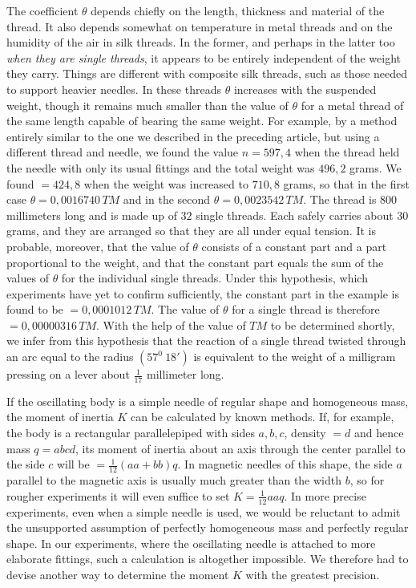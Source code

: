 The coefficient $\theta$ depends chiefly on the length, thickness and material of the thread. It also depends somewhat on temperature in metal threads and on the humidity of the air in silk threads. In the former, and perhaps in the latter too \textit{when they are single threads}, it appears to be entirely independent of the weight they carry. Things are different with composite silk threads, such as those needed to support heavier needles. In these threads $\theta$ increases with the suspended weight, though it remains much smaller than the value of $\theta$ for a metal thread of the same length capable of bearing the same weight. For example, by a method entirely similar to the one we described in the preceding article, but using a different thread and needle, we found the value $n=597{,}4$ when the thread held the needle with only its usual fittings and the total weight was $496{,}2$ grams. We found $=424{,}8$ when the weight was increased to $710{,}8$ grams, so that in the first case $\theta=0{,}0016740\,TM$ and in the second $\theta=0{,}0023542\,TM$. The thread is $800$ millimeters long and is made up of $32$ single threads. Each safely carries about $30$ grams, and they are arranged so that they are all under equal tension. It is probable, moreover, that the value of $\theta$ consists of a constant part and a part proportional to the weight, and that the constant part equals the sum of the values of $\theta$ for the individual single threads. Under this hypothesis, which experiments have yet to confirm sufficiently, the constant part in the example is found to be $=0{,}0001012\,TM$. The value of $\theta$ for a single thread is therefore $=0{,}00000316\,TM$. With the help of the value of $TM$ to be determined shortly, we infer from this hypothesis that the reaction of a single thread twisted through an arc equal to the radius $(57^0\ 18')$ is equivalent to the weight of a milligram pressing on a lever about $\frac1{17}$ millimeter long.

If the oscillating body is a simple needle of regular shape and homogeneous mass, the moment of inertia $K$ can be calculated by known methods. If, for example, the body is a rectangular parallelepiped with sides $a,b,c$, density $=d$ and hence mass $q=abcd$, its moment of inertia about an axis through the center parallel to the side $c$ will be $=\frac1{12}(aa+bb)q$. In magnetic needles of this shape, the side $a$ parallel to the magnetic axis is usually much greater than the width $b$, so for rougher experiments it will even suffice to set $K=\frac1{12}aaq$. In more precise experiments, even when a simple needle is used, we would be reluctant to admit the unsupported assumption of perfectly homogeneous mass and perfectly regular shape. In our experiments, where the oscillating needle is attached to more elaborate fittings, such a calculation is altogether impossible. We therefore had to devise another way to determine the moment $K$ with the greatest precision.

